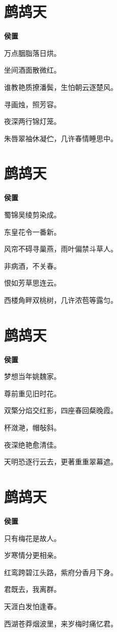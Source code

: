 \documentclass[12pt,a4paper]{ctexbook}
\begin{document}
\section{鹧鸪天}
\textbf{侯置}\par\vspace{0.5em}
万点胭脂落日烘。\par
坐间酒面散微红。\par
谁教艳质撩潘鬓，生怕朝云逐楚风。\par
寻画烛，照芳容。\par
夜深两行锦灯笼。\par
朱唇翠袖休凝伫，几许春情睡思中。\par

\section{鹧鸪天}
\textbf{侯置}\par\vspace{0.5em}
蜀锦吴绫剪染成。\par
东皇花令一番新。\par
风帘不碍寻巢燕，雨叶偏禁斗草人。\par
非病酒，不关春。\par
恨如芳草思连云。\par
西楼角畔双桃树，几许浓苞等露匀。\par

\section{鹧鸪天}
\textbf{侯置}\par\vspace{0.5em}
梦想当年姚魏家。\par
尊前重见旧时花。\par
双檠分焰交红影，四座春回粲晚霞。\par
杯潋滟，帽敧斜。\par
夜深绝艳愈清佳。\par
天明恐逐行云去，更著重重翠幕遮。\par

\section{鹧鸪天}
\textbf{侯置}\par\vspace{0.5em}
只有梅花是故人。\par
岁寒情分更相亲。\par
红鸾跨碧江头路，紫府分香月下身。\par
君既去，我离群。\par
天涯白发怕逢春。\par
西湖苍莽烟波里，来岁梅时痛忆君。\par
\end{document}
